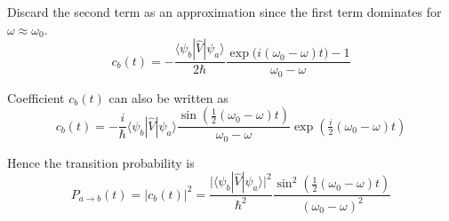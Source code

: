 Discard the second term as an approximation since the first
term dominates for $\omega\approx\omega_0$.
\begin{equation*}
c_b(t)=-\frac{\langle\psi_b|\hat V|\psi_a\rangle}{2\hbar}
\frac{\exp\bigl(i(\omega_0-\omega)t\bigr)-1}{\omega_0-\omega}
\end{equation*}

Coefficient $c_b(t)$ can also be written as
\begin{equation*}
c_b(t)=-\frac{i}{\hbar}\langle\psi_b|\hat V|\psi_a\rangle
\frac{\sin\left(\tfrac{1}{2}(\omega_0-\omega)t\right)}{\omega_0-\omega}
\exp\left(\tfrac{i}{2}(\omega_0-\omega)t\right)
\tag{3}
\end{equation*}

Hence the transition probability is
\begin{equation*}
P_{a\rightarrow b}(t)=|c_b(t)|^2
=\frac{\bigl|\langle\psi_b|\hat V|\psi_a\rangle\bigr|^2}{\hbar^2}
\frac{\sin^2\left(\tfrac{1}{2}(\omega_0-\omega)t\right)}
{(\omega_0-\omega)^2}
\tag{4}
\end{equation*}


